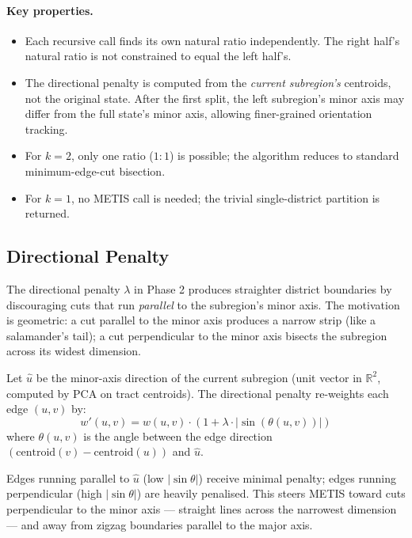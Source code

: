 \paragraph{Key properties.}
\begin{itemize}
\item Each recursive call finds its own natural ratio independently.
  The right half's natural ratio is not constrained to equal the left half's.
\item The directional penalty is computed from the \emph{current subregion's}
  centroids, not the original state.
  After the first split, the left subregion's minor axis may differ from the
  full state's minor axis, allowing finer-grained orientation tracking.
\item For $k=2$, only one ratio ($1:1$) is possible; the algorithm reduces
  to standard minimum-edge-cut bisection.
\item For $k=1$, no METIS call is needed; the trivial single-district
  partition is returned.
\end{itemize}

\subsection{Directional Penalty}
\label{sec:phase2}

The directional penalty $\lambda$ in Phase 2 produces straighter district
boundaries by discouraging cuts that run \emph{parallel} to the subregion's
minor axis.
The motivation is geometric: a cut parallel to the minor axis produces a
narrow strip (like a salamander's tail); a cut perpendicular to the minor
axis bisects the subregion across its widest dimension.

\begin{definition}
Let $\hat{u}$ be the minor-axis direction of the current subregion
(unit vector in $\mathbb{R}^2$, computed by PCA on tract centroids).
The directional penalty re-weights each edge $(u,v)$ by:
\[
  w'(u,v) = w(u,v) \cdot (1 + \lambda \cdot |\!\sin(\theta(u,v))|)
\]
where $\theta(u,v)$ is the angle between the edge direction
$(\mathrm{centroid}(v) - \mathrm{centroid}(u))$ and $\hat{u}$.
\end{definition}

Edges running parallel to $\hat{u}$ (low $|\!\sin\theta|$) receive minimal
penalty; edges running perpendicular (high $|\!\sin\theta|$) are heavily
penalised.
This steers METIS toward cuts perpendicular to the minor axis --- straight
lines across the narrowest dimension --- and away from zigzag boundaries
parallel to the major axis.

